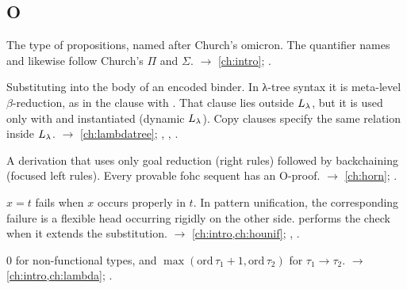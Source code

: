 \subsection*{O}
\begin{glossarylist}
\item[\texttt{o}] The type of propositions, named after Church's omicron. The quantifier names  and
   likewise follow Church's $\Pi$ and $\Sigma$. $\rightarrow$ \cref{ch:intro}; .
\item[Object-level substitution] Substituting into the body of an encoded binder. In λ-tree syntax it is meta-level
  $\beta$-reduction, as in the clause  with . That clause lies outside
  $L_\lambda$, but it is used only with  and  instantiated (dynamic $L_\lambda$). Copy clauses specify the same
  relation inside $L_\lambda$. $\rightarrow$ \cref{ch:lambdatree}; , , .
\item[O-proof] A derivation that uses only goal reduction (right rules) followed by backchaining (focused left
  rules). Every provable fohc sequent has an O-proof. $\rightarrow$ \cref{ch:horn}; .
\item[Occurs check] $x=t$ fails when $x$ occurs properly in $t$. In pattern unification, the corresponding failure
  is a flexible head occurring rigidly on the other side. \micro{} performs the check when it extends the
  substitution. $\rightarrow$ \cref{ch:intro,ch:hounif}; , .
\item[Order of a type] $0$ for non-functional types, and $\max(\mathrm{ord}\,\tau_1+1,\mathrm{ord}\,\tau_2)$ for
  $\tau_1\to\tau_2$. $\rightarrow$ \cref{ch:intro,ch:lambda}; .
\end{glossarylist}

